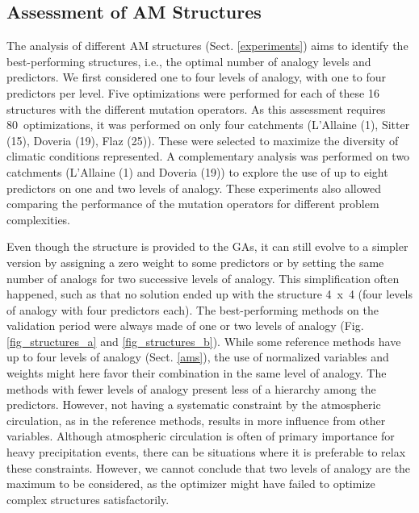 \documentclass[draft]{agujournal2019}
\begin{document}
\subsection{Assessment of AM Structures}
\label{structures}

The analysis of different AM structures (Sect. \ref{experiments}) aims to identify the best-performing structures, i.e., the optimal number of analogy levels and predictors. We first considered one to four levels of analogy, with one to four predictors per level. Five optimizations were performed for each of these 16 structures with the different mutation operators. As this assessment requires 80~optimizations, it was performed on only four catchments (L'Allaine (1), Sitter (15), Doveria (19), Flaz (25)). These were selected to maximize the diversity of climatic conditions represented. A complementary analysis was performed on two catchments (L'Allaine (1) and Doveria (19)) to explore the use of up to eight predictors on one and two levels of analogy. These experiments also allowed comparing the performance of the mutation operators for different problem complexities.

Even though the structure is provided to the GAs, it can still evolve to a simpler version by assigning a zero weight to some predictors or by setting the same number of analogs for two successive levels of analogy. This simplification often happened, such as that no solution ended up with the structure 4~x~4 (four levels of analogy with four predictors each). The best-performing methods on the validation period were always made of one or two levels of analogy (Fig. \ref{fig_structures_a} and \ref{fig_structures_b}). While some reference methods have up to four levels of analogy (Sect. \ref{ams}), the use of normalized variables and weights might here favor their combination in the same level of analogy. The methods with fewer levels of analogy present less of a hierarchy among the predictors. However, not having a systematic constraint by the atmospheric circulation, as in the reference methods, results in more influence from other variables. Although atmospheric circulation is often of primary importance for heavy precipitation events, there can be situations where it is preferable to relax these constraints. However, we cannot conclude that two levels of analogy are the maximum to be considered, as the optimizer might have failed to optimize complex structures satisfactorily.
\end{document}
